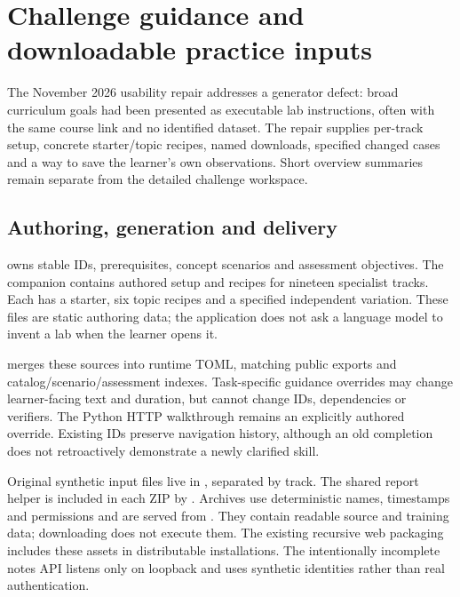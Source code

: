 \section{Challenge guidance and downloadable practice inputs}
\label{learning-guidance}

The November 2026 usability repair addresses a generator defect: broad curriculum
goals had been presented as executable lab instructions, often with the same
course link and no identified dataset. The repair supplies per-track setup,
concrete starter/topic recipes, named downloads, specified changed cases and a
way to save the learner's own observations. Short overview summaries remain
separate from the detailed challenge workspace.

\subsection{Authoring, generation and delivery}
 owns stable IDs, prerequisites,
concept scenarios and assessment objectives. The companion
 contains authored setup and recipes for
nineteen specialist tracks. Each has a starter, six topic recipes and a specified
independent variation. These files are static authoring data; the application
does not ask a language model to invent a lab when the learner opens it.

 merges these sources into runtime TOML,
matching public exports and catalog/scenario/assessment indexes. Task-specific
guidance overrides may change learner-facing text and duration, but cannot change
IDs, dependencies or verifiers. The Python HTTP walkthrough remains an explicitly
authored override. Existing IDs preserve navigation history, although an old
completion does not retroactively demonstrate a newly clarified skill.

Original synthetic input files live in
, separated by track. The shared report helper
is included in each ZIP by . Archives
use deterministic names, timestamps and permissions and are served from
. They contain readable source and training data; downloading
does not execute them. The existing recursive web packaging includes these assets
in distributable installations. The intentionally incomplete notes API listens
only on loopback and uses synthetic identities rather than real authentication.

